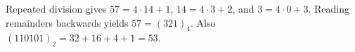 Repeated division gives $57=4\cdot14+1$, $14=4\cdot3+2$, and $3=4\cdot0+3$. Reading remainders backwards yields $57=(321)_4$. Also $(110101)_2=32+16+4+1=53$.

